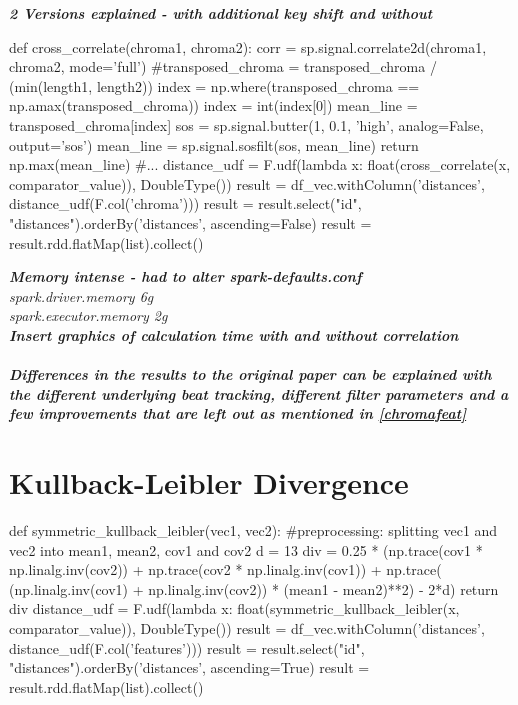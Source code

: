 \textit{\textbf{2 Versions explained - with additional key shift and without}}
\begin{pythonCode}
def cross_correlate(chroma1, chroma2):
    corr = sp.signal.correlate2d(chroma1, chroma2, mode='full')
    #transposed_chroma = transposed_chroma / (min(length1, length2))
    index = np.where(transposed_chroma == np.amax(transposed_chroma))
    index = int(index[0])
    mean_line = transposed_chroma[index]
    sos = sp.signal.butter(1, 0.1, 'high', analog=False, output='sos')
    mean_line = sp.signal.sosfilt(sos, mean_line)
    return np.max(mean_line)
#...
distance_udf = F.udf(lambda x: float(cross_correlate(x, comparator_value)), DoubleType())
result = df_vec.withColumn('distances', distance_udf(F.col('chroma')))
result = result.select("id", "distances").orderBy('distances', ascending=False)
result = result.rdd.flatMap(list).collect()
\end{pythonCode}

\noindent\textbf{\textit{Memory intense - had to alter spark-defaults.conf\\}}
\textit{spark.driver.memory             6g\\
spark.executor.memory           2g\\
}
\noindent\textbf{\textit{Insert graphics of calculation time with and without correlation\\}}
\ \\
\noindent\textbf{\textit{Differences in the results to the original paper can be explained with the different underlying beat tracking, different filter parameters and a few improvements that are left out as mentioned in \ref{chromafeat}}\cite{cover802}}

\section{Kullback-Leibler Divergence}

\begin{pythonCode}
def symmetric_kullback_leibler(vec1, vec2):
	#preprocessing: splitting vec1 and vec2 into mean1, mean2, cov1 and cov2
    d = 13
    div = 0.25 * (np.trace(cov1 * np.linalg.inv(cov2)) + np.trace(cov2 * np.linalg.inv(cov1)) + np.trace( (np.linalg.inv(cov1) + np.linalg.inv(cov2)) * (mean1 - mean2)**2) - 2*d)
    return div
distance_udf = F.udf(lambda x: float(symmetric_kullback_leibler(x, comparator_value)), DoubleType())
result = df_vec.withColumn('distances', distance_udf(F.col('features')))
result = result.select("id", "distances").orderBy('distances', ascending=True)
result = result.rdd.flatMap(list).collect()
\end{pythonCode}

